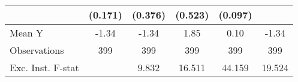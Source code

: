 {\begin{tabular}{l*{5}{c}}
            &     (0.171)         &     (0.376)         &     (0.523)         &     (0.097)         &                     \\
\midrule
Mean Y      &       -1.34         &       -1.34         &        1.85         &        0.10         &       -1.34         \\
Observations&         399         &         399         &         399         &         399         &         399         \\
Exc. Inst. F-stat&                     &       9.832         &      16.511         &      44.159         &      19.524         \\
\bottomrule
\end{tabular}
}
